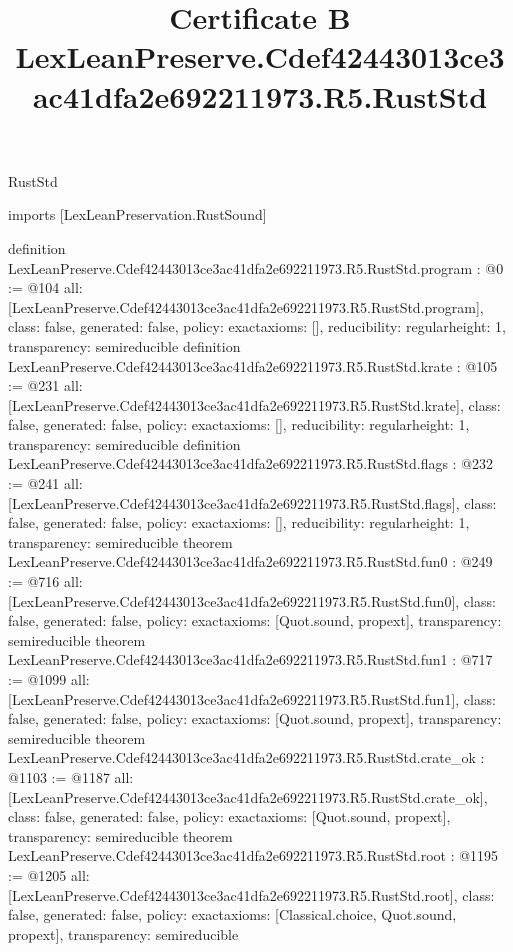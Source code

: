 \begin{lexlean}{RustStd}
\title{Certificate B LexLeanPreserve.Cdef42443013ce3ac41dfa2e692211973.R5.RustStd}
\begin{coremodule}
imports [LexLeanPreservation.RustSound]

definition LexLeanPreserve.Cdef42443013ce3ac41dfa2e692211973.R5.RustStd.program : @0 := @104 {
  all: [LexLeanPreserve.Cdef42443013ce3ac41dfa2e692211973.R5.RustStd.program],
  class: false,
  generated: false,
  policy: exact{axioms: []},
  reducibility: regular{height: 1},
  transparency: semireducible
}
definition LexLeanPreserve.Cdef42443013ce3ac41dfa2e692211973.R5.RustStd.krate : @105 := @231 {
  all: [LexLeanPreserve.Cdef42443013ce3ac41dfa2e692211973.R5.RustStd.krate],
  class: false,
  generated: false,
  policy: exact{axioms: []},
  reducibility: regular{height: 1},
  transparency: semireducible
}
definition LexLeanPreserve.Cdef42443013ce3ac41dfa2e692211973.R5.RustStd.flags : @232 := @241 {
  all: [LexLeanPreserve.Cdef42443013ce3ac41dfa2e692211973.R5.RustStd.flags],
  class: false,
  generated: false,
  policy: exact{axioms: []},
  reducibility: regular{height: 1},
  transparency: semireducible
}
theorem LexLeanPreserve.Cdef42443013ce3ac41dfa2e692211973.R5.RustStd.fun0 : @249 := @716 {
  all: [LexLeanPreserve.Cdef42443013ce3ac41dfa2e692211973.R5.RustStd.fun0],
  class: false,
  generated: false,
  policy: exact{axioms: [Quot.sound, propext]},
  transparency: semireducible
}
theorem LexLeanPreserve.Cdef42443013ce3ac41dfa2e692211973.R5.RustStd.fun1 : @717 := @1099 {
  all: [LexLeanPreserve.Cdef42443013ce3ac41dfa2e692211973.R5.RustStd.fun1],
  class: false,
  generated: false,
  policy: exact{axioms: [Quot.sound, propext]},
  transparency: semireducible
}
theorem LexLeanPreserve.Cdef42443013ce3ac41dfa2e692211973.R5.RustStd.crate_ok : @1103 := @1187 {
  all: [LexLeanPreserve.Cdef42443013ce3ac41dfa2e692211973.R5.RustStd.crate_ok],
  class: false,
  generated: false,
  policy: exact{axioms: [Quot.sound, propext]},
  transparency: semireducible
}
theorem LexLeanPreserve.Cdef42443013ce3ac41dfa2e692211973.R5.RustStd.root : @1195 := @1205 {
  all: [LexLeanPreserve.Cdef42443013ce3ac41dfa2e692211973.R5.RustStd.root],
  class: false,
  generated: false,
  policy: exact{axioms: [Classical.choice, Quot.sound, propext]},
  transparency: semireducible
}


\end{coremodule}
\end{lexlean}

